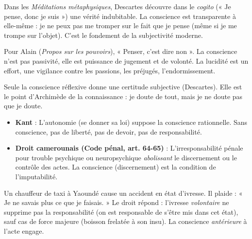 \documentclass[11pt]{article}
\newcommand{\cle}[1]{{\popxbold\color{popdark}#1}}
\newcounter{popsec}
\newcounter{popsub}
\newcommand{\courssub}[1]{%
  \stepcounter{popsub}%
  \par\vspace{9pt}\noindent{\popxbold\fontsize{11.5}{13}\selectfont\color{popink}{\color{poporange}\thepopsec.\thepopsub}\hspace{6pt}#1}\par\nopagebreak\vspace{4pt}
}
\begin{document}
\begin{savaistu}
Dans les \emph{Méditations métaphysiques}, Descartes découvre dans le \emph{cogito} (« Je pense, donc je suis ») une vérité indubitable. La conscience est \cle{transparente à elle-même} : je ne peux pas me tromper sur le fait que je pense (même si je me trompe sur l'objet). C'est le fondement de la subjectivité moderne.
\end{savaistu}

\begin{savaistu}
Pour Alain (\emph{Propos sur les pouvoirs}), « Penser, c'est dire non ». La conscience n'est pas passivité, elle est \cle{puissance de jugement} et de volonté. La lucidité est un effort, une vigilance contre les passions, les préjugés, l'endormissement.
\end{savaistu}

\courssub{Valeur de la conscience}

\begin{propriete}
Seule la conscience réflexive donne une \cle{certitude subjective} (Descartes). Elle est le point d'Archimède de la connaissance : je doute de tout, mais je ne doute pas que je doute.
\end{propriete}

\begin{propriete}
\begin{itemize}
\item \textbf{Kant} : L'autonomie (se donner sa loi) suppose la conscience rationnelle. Sans conscience, pas de liberté, pas de devoir, pas de responsabilité.
\item \textbf{Droit camerounais (Code pénal, art. 64-65)} : L'irresponsabilité pénale pour trouble psychique ou neuropsychique \emph{abolissant} le discernement ou le contrôle des actes. La conscience (discernement) est la condition de l'imputabilité.
\end{itemize}
\end{propriete}

\begin{exemplebox}
Un chauffeur de taxi à Yaoundé cause un accident en état d'ivresse. Il plaide : « Je ne savais plus ce que je faisais. » Le droit répond : l'ivresse \emph{volontaire} ne supprime pas la responsabilité (on est responsable de s'être mis dans cet état), sauf cas de force majeure (boisson frelatée à son insu). La conscience \emph{antérieure} à l'acte engage.
\end{exemplebox}
\end{document}
